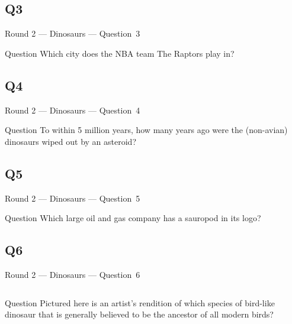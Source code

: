 \documentclass[11pt]{beamer}
\begin{document}
\subsection*{Q3}
\begin{frame}[t]{Round 2 --- Dinosaurs --- \mbox{Question 3}}
\vspace{-0.5em}
\begin{block}{Question}
Which city does the NBA team The Raptors play in?
\end{block}
\end{frame}
\subsection*{Q4}
\begin{frame}[t]{Round 2 --- Dinosaurs --- \mbox{Question 4}}
\vspace{-0.5em}
\begin{block}{Question}
To within 5 million years, how many years ago were the (non-avian) dinosaurs wiped out by an asteroid?
\end{block}
\end{frame}
\subsection*{Q5}
\begin{frame}[t]{Round 2 --- Dinosaurs --- \mbox{Question 5}}
\vspace{-0.5em}
\begin{block}{Question}
Which large oil and gas company has a sauropod in its logo?
\end{block}
\end{frame}
\subsection*{Q6}
\begin{frame}[t]{Round 2 --- Dinosaurs --- \mbox{Question 6}}
\vspace{-0.5em}
\begin{columns}[T,totalwidth=\linewidth]
\begin{column}{0.37\linewidth}
\begin{block}{Question}
Pictured here is an artist's rendition of which species of bird-like dinosaur that is generally believed to be the ancestor of all modern birds?
\end{block}
\end{column}
\begin{column}{0.62\linewidth}
\begin{center}
\texttt{[image: \{Images/archaeopteryx]}.jpg}
\end{center}
\end{column}
\end{columns}
\end{frame}
\end{document}
